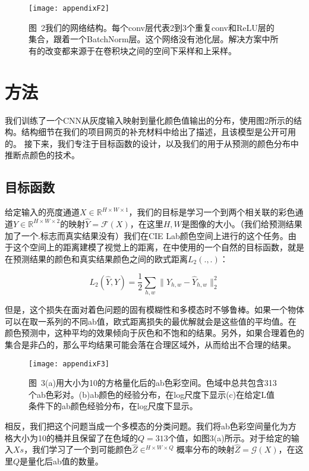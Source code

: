 \begin{figure}[h]
  \centering
  \texttt{[image: appendixF2]}
  \caption*{图~2\quad 我们的网络结构。每个conv层代表2到3个重复conv和ReLU层的集合，跟着一个BatchNorm层。这个网络没有池化层。解决方案中所有的改变都来源于在卷积块之间的空间下采样和上采样。}
  \label{tab:badfigure2}
\end{figure}

\section{方法}
我们训练了一个CNN从灰度输入映射到量化颜色值输出的分布，使用图2所示的结构。结构细节在我们的项目网页的补充材料中给出了描述，且该模型是公开可用的。 接下来，我们专注于目标函数的设计，以及我们的用于从预测的颜色分布中推断点颜色的技术。

\subsection{目标函数}
给定输入的亮度通道$X \in \mathbb{R}^{H \times W \times 1}$，我们的目标是学习一个到两个相关联的彩色通道$Y \in \mathbb{R}^{H \times W \times 2}$的映射$\hat{Y} = \mathcal{F}(X)$，在这里$H, W$是图像的大小。（我们给预测结果加了一个$\hat{.}$标志而真实结果没有）我们在CIE Lab颜色空间上进行的这个任务。由于这个空间上的距离建模了视觉上的距离，在中使用的一个自然的目标函数，就是在预测结果的颜色和真实结果颜色之间的欧式距离$L_2(.,.)$：

\begin{equation}\tag*{(1)}
L_2(\hat{Y}, Y) = \frac{1}{2}\sum_{h,w}\|Y_{h,w} - \hat{Y}_{h,w}\|_{2}^{2}
\end{equation}

但是，这个损失在面对着色问题的固有模糊性和多模态时不够鲁棒。如果一个物体可以在取一系列的不同ab值，欧式距离损失的最优解就会是这些值的平均值。在颜色预测中，这种平均的效果倾向于灰色和不饱和的结果。另外，如果合理着色的集合是非凸的，那么平均结果可能会落在合理区域外，从而给出不合理的结果。

\begin{figure}[h]
  \centering
  \texttt{[image: appendixF3]}
  \caption*{图~3\quad (a)用大小为10的方格量化后的ab色彩空间。色域中总共包含313个ab色彩对。(b)ab颜色的经验分布，在log尺度下显示(c)在给定L值条件下的ab颜色经验分布，在log尺度下显示。}
  \label{tab:badfigure3}
\end{figure}

相反，我们把这个问题当成一个多模态的分类问题。我们将ab色彩空间量化为方格大小为10的桶并且保留了在色域的$Q = 313$个值，如图3(a)所示。对于给定的输入$Xs$，我们学习了一个到可能颜色$\hat{Z} \in ^{H \times W \times Q}$概率分布的映射$\hat{Z} = \mathcal{G}(X)$，在这里$Q$是量化后ab值的数量。

